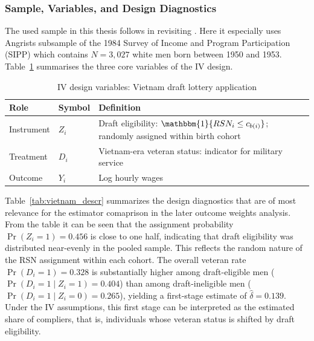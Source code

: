 \documentclass[12pt, a4paper, oneside]{article}
\theoremstyle{plain}
\theoremstyle{definition}
\begin{document}
\subsubsection{Sample, Variables, and Design Diagnostics}
\label{subsubsec:vietnam_sample}

The used sample in this thesis follows \citet{sloczynski2025abadie} in revisiting \citet{angrist1990lifetime}.
Here it especially uses Angrists subsample of the 1984 Survey of Income and Program Participation
(SIPP) which contains $N = 3{,}027$ white men born between 1950 and
1953. Table~\ref{tab:vietnam_vars} summarises the three
core variables of the IV design.

\begin{table}[htbp]
\centering
\caption{IV design variables: Vietnam draft lottery application}
\label{tab:vietnam_vars}
\begin{tabular}{@{}llp{7.5cm}@{}}
\toprule
Role & Symbol & Definition \\
\midrule
Instrument  & $Z_i$ & Draft eligibility: $\mathbbm{1}\{RSN_i \leq c_{b(i)}\}$;
                       randomly assigned within birth cohort \\[4pt]
Treatment   & $D_i$ & Vietnam-era veteran status: indicator for
                       military service \\[4pt]
Outcome     & $Y_i$ & Log hourly wages \\
\bottomrule
\end{tabular}
\end{table}

Table~\ref{tab:vietnam_descr} summarizes the design diagnostics that are of most relevance for the estimator comaprison in the later outcome weights analysis.
From the table it can be seen that the assignment probability $\Pr(Z_i = 1) = 0.456$ is close to one half,
indicating that draft eligibility was distributed near-evenly in the
pooled sample. This reflects the random nature of the RSN assignment
within each cohort.
The overall veteran rate $\Pr(D_i = 1) = 0.328$ is substantially higher
among draft-eligible men ($\Pr(D_i=1 \mid Z_i=1) = 0.404$) than among
draft-ineligible men ($\Pr(D_i=1 \mid Z_i=0) = 0.265$), yielding a
first-stage estimate of $\hat\delta = 0.139$. Under the IV assumptions, this first stage can be interpreted as the estimated share of compliers, that is, individuals whose veteran status is shifted by draft eligibility.
\end{document}
